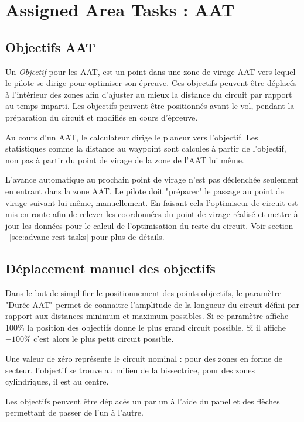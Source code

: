 \section{Assigned Area Tasks : AAT}\label{sec:aat-tasks}

\subsection*{Objectifs AAT}

Un {\em Objectif} pour les AAT, est un point dans une zone de virage AAT vers lequel le pilote se dirige pour optimiser son épreuve. Ces objectifs peuvent être déplacés à l'intérieur des zones afin d'ajuster au mieux la distance du circuit par rapport au temps imparti. Les objectifs peuvent être positionnés avant le vol, pendant la préparation du circuit et modifiés en cours d'épreuve.

Au cours d'un AAT, le calculateur dirige le planeur vers l'objectif. Les statistiques comme la distance au waypoint sont calcules à partir de l'objectif, non pas à partir du point de virage de la zone de l'AAT lui même.

L'avance automatique au prochain point de virage n'est pas déclenchée seulement en entrant dans la zone AAT. Le pilote doit "préparer" le passage au point de virage suivant lui même, manuellement. En faisant cela l'optimiseur de circuit est mis en route afin de relever les coordonnées du point de virage réalisé et mettre à jour les données pour le calcul de l'optimisation du reste du circuit. Voir section ~\ref{sec:advanc-rest-tasks} pour plus de détails.

\subsection*{Déplacement manuel des objectifs}
Dans le but de simplifier le positionnement des points objectifs, le paramètre "Durée AAT" permet de connaitre l'amplitude de la longueur du circuit défini par rapport aux distances minimum et maximum possibles. Si ce paramètre affiche 100\% la position des objectifs donne le plus grand circuit possible. Si il affiche ~$-100$\% c'est alors le plus petit circuit possible. 

Une valeur de zéro représente le circuit nominal : pour des zones en forme de secteur, l'objectif se trouve au milieu de la bissectrice, pour des zones cylindriques, il est au centre.

Les objectifs peuvent être déplacés un par un à l'aide du panel  et des flèches permettant de passer de l'un à l'autre.\\

